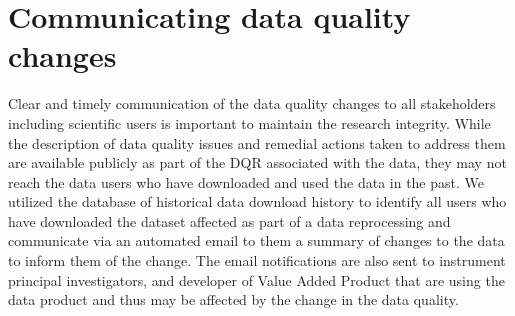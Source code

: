 \section{Communicating data quality changes}
Clear and timely communication of the data quality changes to all
stakeholders including scientific users is important to maintain
the research integrity. 
While the description of data quality issues and
remedial actions taken to address them are available publicly as part of
the DQR associated with the data, they may not reach the data users who
have downloaded and used the data in the past. We utilized the database
of historical data download history to identify all users who have
downloaded the dataset affected as part of a data reprocessing and
communicate via an automated email to them a summary of changes to the
data to inform them of the change. The email notifications are also sent
to instrument principal investigators, and developer of Value Added
Product that are using the data product and thus may be affected by the
change in the data quality.



